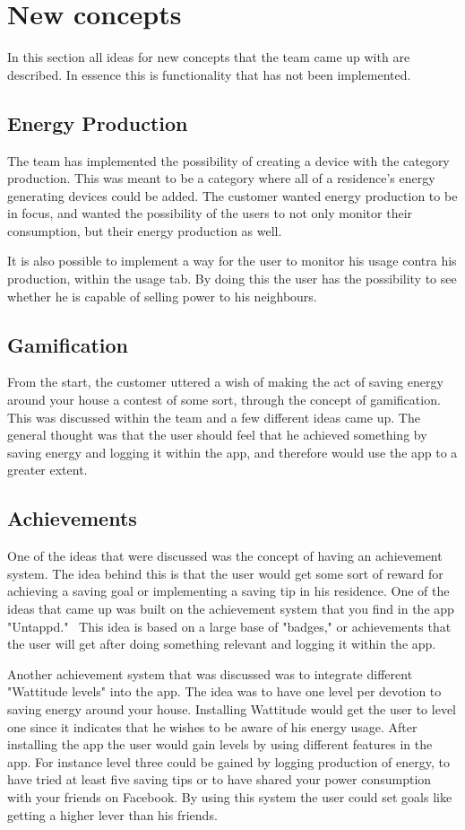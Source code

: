 \section{New concepts}
In this section all ideas for new concepts that the team came up with are described. In essence this is functionality that has not been implemented.

\subsection{Energy Production}
The team has implemented the possibility of creating a device with the category production. This was meant to be a category where all of a residence's energy generating devices could be added. The customer wanted energy production to be in focus, and wanted the possibility of the users to not only monitor their consumption, but their energy production as well. 

It is also possible to implement a way for the user to monitor his usage contra his production, within the usage tab. By doing this the user has the possibility to see whether he is capable of selling power to his neighbours. 

\subsection{Gamification}
From the start, the customer uttered a wish of making the act of saving energy around your house a contest of some sort, through the concept of gamification. This was discussed within the team and a few different ideas came up. The general thought was that the user should feel that he achieved something by saving energy and logging it within the app, and therefore would use the app to a greater extent. 

\subsection{Achievements}
One of the ideas that were discussed was the concept of having an achievement system. The idea behind this is that the user would get some sort of reward for achieving a saving goal or implementing a saving tip in his residence. One of the ideas that came up was built on the achievement system that you find in the app "Untappd."~\cite{untappd}
This idea is based on a large base of "badges," or achievements that the user will get after doing something relevant and logging it within the app. 

Another achievement system that was discussed was to integrate different "Wattitude levels" into the app. The idea was to have one level per devotion to saving energy around your house. Installing Wattitude would get the user to level one since it indicates that he wishes to be aware of his energy usage. After installing the app the user would gain levels by using different features in the app. For instance level three could be gained by logging production of energy, to have tried at least five saving tips or to have shared your power consumption with your friends on Facebook. By using this system the user could set goals like getting a higher lever than his friends.

